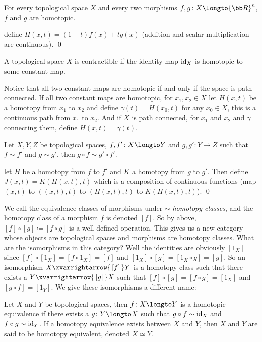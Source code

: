 \bprop

    For every topological space $X$ and every two morphisms $f,g\colon X\longto{\bb R}^n$, $f$ and $g$ are homotopic.

\eprop

\Proof define $H(x,t)=(1-t)f(x)+tg(x)$ (addition and scalar multiplication are continuous).
\qed

\bdefn

    A topological space $X$ is {\emphcolor contractible} if the identity map ${\rm id}_X$ is homotopic to some constant map.

\edefn

Notice that all two constant maps are homotopic if and only if the space is path connected.
If all two constant maps are homotopic, for $x_1,x_2\in X$ let $H(x,t)$ be a homotopy from $x_1$ to $x_2$ and define $\gamma(t)=H(x_0,t)$ for any $x_0\in X$, this is a continuous path from $x_1$ to $x_2$.
And if $X$ is path connected, for $x_1$ and $x_2$ and $\gamma$ connecting them, define $H(x,t)=\gamma(t)$.

\bprop

    Let $X,Y,Z$ be topological spaces, $f,f'\colon X\longto Y$ and $g,g'\colon Y\to Z$ such that $f\sim f'$ and $g\sim g'$, then $g\circ f\sim g'\circ f'$.

\eprop

\Proof let $H$ be a homotopy from $f$ to $f'$ and $K$ a homotopy from $g$ to $g'$.
Then define $J(x,t)=K(H(x,t),t)$ which is a composition of continuous functions (map $(x,t)$ to $((x,t),t)$ to $(H(x,t),t)$ to $K(H(x,t),t)$).
\qed

We call the equivalence classes of morphisms under $\sim$ {\it homotopy classes}, and the homotopy class of a morphism $f$ is denoted $[f]$.
So by above, $[f]\circ[g]\coloneqq[f\circ g]$ is a well-defined operation.
This gives us a new category whose objects are topological spaces and morphisms are homotopy classes.
What are the isomorphisms in this category?
Well the identities are obviously $[1_X]$ since $[f]\circ[1_X]=[f\circ1_X]=[f]$ and $[1_X]\circ[g]=[1_X\circ g]=[g]$.
So an isomorphism $X\xvarrightarrow{\,[f]\,}Y$ is a homotopy class such that there exists a $Y\xvarrightarrow{\,[g]\,}X$ such that $[f]\circ[g]=[f\circ g]=[1_X]$ and $[g\circ f]=[1_Y]$.
We give these isomorphisms a different name:

\bdefn

    Let $X$ and $Y$ be topological spaces, then $f\colon X\longto Y$ is a {\emphcolor homotopic equivalence} if there exists a $g\colon Y\longto X$ such that $g\circ f\sim{\rm id}_X$ and
    $f\circ g\sim{\rm id}_Y$.
    If a homotopy equivalence exists between $X$ and $Y$, then $X$ and $Y$ are said to be {\emphcolor homotopy equivalent}, denoted $X\simeq Y$.

